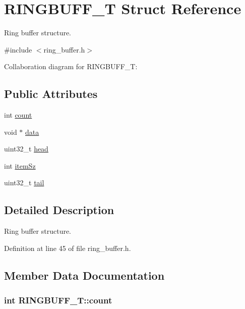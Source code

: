 \hypertarget{structRINGBUFF__T}{}\section{R\+I\+N\+G\+B\+U\+F\+F\+\_\+T Struct Reference}
\label{structRINGBUFF__T}


Ring buffer structure.  




{\ttfamily \#include $<$ring\+\_\+buffer.\+h$>$}



Collaboration diagram for R\+I\+N\+G\+B\+U\+F\+F\+\_\+T\+:
\subsection*{Public Attributes}
\begin{DoxyCompactItemize}
\item 
int \hyperlink{structRINGBUFF__T_a87af72a615ed11d5c7000904a2fe5b4a}{count}
\item 
void $\ast$ \hyperlink{structRINGBUFF__T_a72858dc34b0dd618118388924c28967c}{data}
\item 
uint32\+\_\+t \hyperlink{structRINGBUFF__T_a30c2ea59e510513e18bb22b4c783e6bb}{head}
\item 
int \hyperlink{structRINGBUFF__T_a8d36d35edc73f36f7f81e98693ef3259}{item\+Sz}
\item 
uint32\+\_\+t \hyperlink{structRINGBUFF__T_a490ce2de2b2e234beeafdb9f9298f20f}{tail}
\end{DoxyCompactItemize}


\subsection{Detailed Description}
Ring buffer structure. 

Definition at line 45 of file ring\+\_\+buffer.\+h.



\subsection{Member Data Documentation}
\subsubsection[{\texorpdfstring{count}{count}}]{\setlength{\rightskip}{0pt plus 5cm}int R\+I\+N\+G\+B\+U\+F\+F\+\_\+\+T\+::count}\hypertarget{structRINGBUFF__T_a87af72a615ed11d5c7000904a2fe5b4a}{}\label{structRINGBUFF__T_a87af72a615ed11d5c7000904a2fe5b4a}



